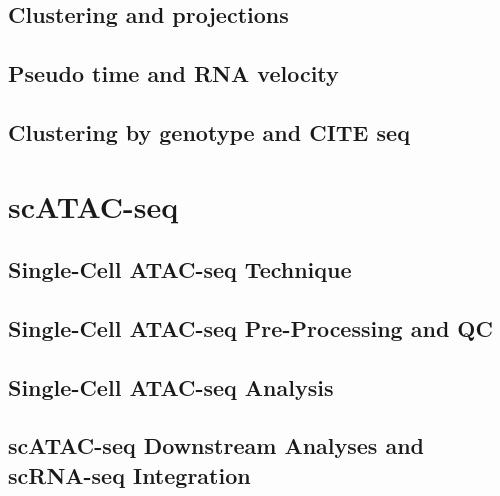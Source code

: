 \documentclass[
]{book}
\begin{document}
\hypertarget{clustering-and-projections}{%
\section{Clustering and projections}\label{clustering-and-projections}}

\hypertarget{pseudo-time-and-rna-velocity}{%
\section{Pseudo time and RNA velocity}\label{pseudo-time-and-rna-velocity}}

\hypertarget{clustering-by-genotype-and-cite-seq}{%
\section{Clustering by genotype and CITE seq}\label{clustering-by-genotype-and-cite-seq}}

\hypertarget{scatac}{%
\chapter{scATAC-seq}\label{scatac}}

\hypertarget{single-cell-atac-seq-technique}{%
\section{Single-Cell ATAC-seq Technique}\label{single-cell-atac-seq-technique}}

\hypertarget{single-cell-atac-seq-pre-processing-and-qc}{%
\section{Single-Cell ATAC-seq Pre-Processing and QC}\label{single-cell-atac-seq-pre-processing-and-qc}}

\hypertarget{single-cell-atac-seq-analysis}{%
\section{Single-Cell ATAC-seq Analysis}\label{single-cell-atac-seq-analysis}}

\hypertarget{scatac-seq-downstream-analyses-and-scrna-seq-integration}{%
\section{scATAC-seq Downstream Analyses and scRNA-seq Integration}\label{scatac-seq-downstream-analyses-and-scrna-seq-integration}}
\end{document}
